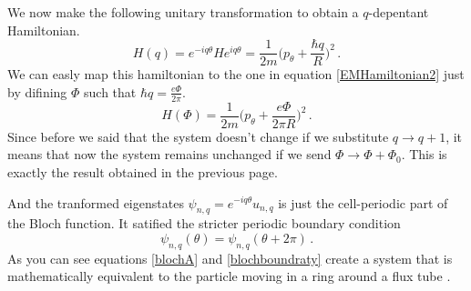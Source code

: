         We now make the following unitary transformation to obtain a $q$-depentant Hamiltonian.
        \[
            H(q)=e^{-iq\theta}He^{iq\theta}=\frac 1{2m}\bigg (p_\theta + \frac {\hbar q}R \bigg)^2\,.
        \]
        We can easly map this hamiltonian to the one in equation \ref{EMHamiltonian2} just by difining $\Phi$ such that $\hbar q= \frac {e\Phi}{2\pi}$. 
        \begin{equation} \label{blochA}
            H(\Phi)=\frac 1{2m}\bigg(p_\theta + \frac{e\Phi}{2\pi R}\bigg)^2\,.
        \end{equation}
        Since before we said that the system doesn't change if we substitute $q\to q+1$, it means that now the system remains unchanged if we send $\Phi \to \Phi+\Phi_0$. This is exactly the result obtained in the previous page.
    
    
        And the tranformed eigenstates $\psi_{n,q}=e^{-iq\theta}u_{n,q}$ is just the cell-periodic part of the Bloch function. It satified the stricter periodic boundary condition
        \begin{equation} \label{blochboundraty}
            \psi_{n,q}(\theta)=\psi_{n,q}(\theta +2\pi)\,.
        \end{equation}
        As you can see equations \ref{blochA}  and \ref{blochboundraty} create a system that is mathematically equivalent to the particle moving in a ring around a flux tube \cite{WeinbergBloch}.







